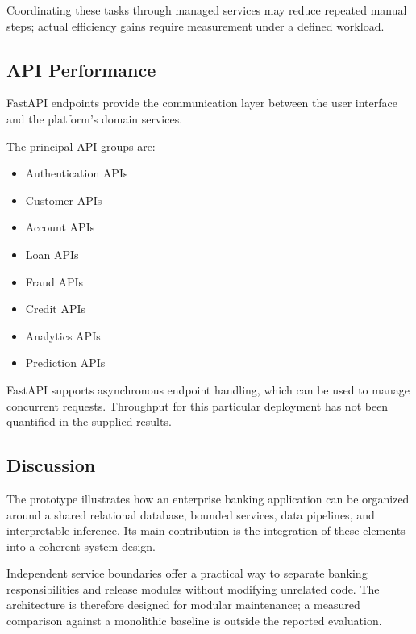 \documentclass[conference]{IEEEtran}
\begin{document}
Coordinating these tasks through managed services may reduce repeated manual steps; actual efficiency gains require measurement under a defined workload.

\subsection{API Performance}

FastAPI endpoints provide the communication layer between the user interface and the platform's domain services.

The principal API groups are:

\begin{itemize}

\item Authentication APIs

\item Customer APIs

\item Account APIs

\item Loan APIs

\item Fraud APIs

\item Credit APIs

\item Analytics APIs

\item Prediction APIs

\end{itemize}

FastAPI supports asynchronous endpoint handling, which can be used to manage concurrent requests. Throughput for this particular deployment has not been quantified in the supplied results.

\subsection{Discussion}

The prototype illustrates how an enterprise banking application can be organized around a shared relational database, bounded services, data pipelines, and interpretable inference. Its main contribution is the integration of these elements into a coherent system design.

Independent service boundaries offer a practical way to separate banking responsibilities and release modules without modifying unrelated code. The architecture is therefore designed for modular maintenance; a measured comparison against a monolithic baseline is outside the reported evaluation.
\end{document}
